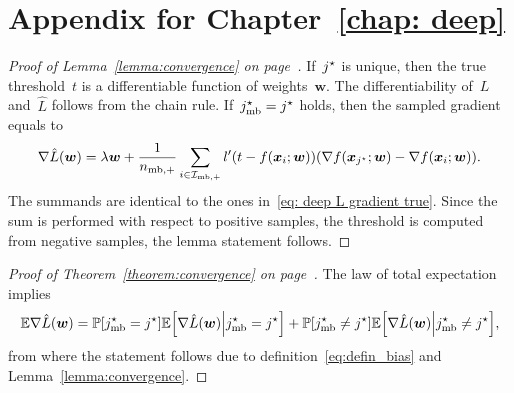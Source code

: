 \chapter{Appendix for Chapter~\ref{chap: deep}}

\lemmacovergencedeep*
\begin{proof}[Proof of Lemma~\ref{lemma:convergence} on page~\pageref{lemma:convergence}]
  If~$j^{\star}$ is unique, then the true threshold~$t$ is a differentiable function of weights~$\bm{w}$. The differentiability of~$L$ and~$\hat{L}$ follows from the chain rule. If~$j^{\star}_{\text{mb}} = j^{\star}$ holds, then the sampled gradient equals to
  \begin{equation}\label{eq:grad_min_aux}
    \nabla \hat L(\bm{w})
      = \lambda \bm{w} + \frac{1}{\nmbpos} \sum_{i\in \Imbpos} l'(t - f(\bm{x}_i; \bm{w})) \Brac{\nabla f(\bm{x}_{\indmax}; \bm{w}) - \nabla f(\bm{x}_i; \bm{w})}.
  \end{equation}
  The summands are identical to the ones in~\eqref{eq: deep L gradient true}. Since the sum is performed with respect to positive samples, the threshold is computed from negative samples, the lemma statement follows.
\end{proof}

\thmcovergencedeep*
\begin{proof}[Proof of Theorem~\ref{theorem:convergence} on page~\pageref{theorem:convergence}]
  The law of total expectation implies
  \begin{equation*}
    \EE \nabla \hat L(\bm{w})
      = \PP \Brac[s]{\indmaxmb = \indmax} \EE \Brac[s]{\nabla \hat L(\bm{w}) \middle\vert \indmaxmb =\indmax}
      + \PP \Brac[s]{\indmaxmb \neq \indmax} \EE \Brac[s]{\nabla \hat L(\bm{w}) \middle\vert\indmaxmb\neq \indmax},
  \end{equation*}
  from where the statement follows due to definition~\eqref{eq:defin_bias} and Lemma~\ref{lemma:convergence}.
\end{proof}
